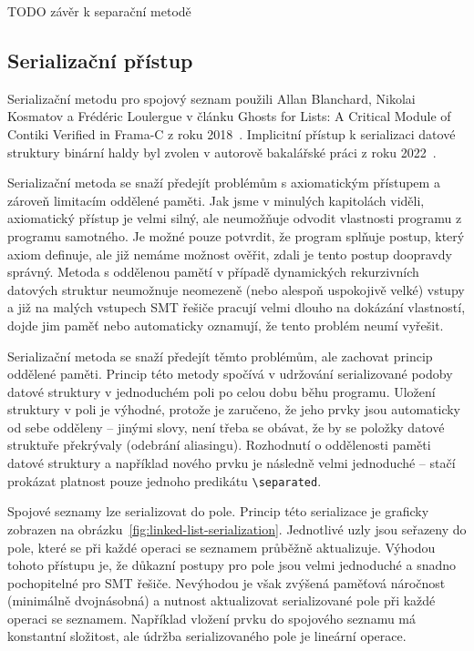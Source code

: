 TODO závěr k separační metodě

\subsection{Serializační přístup}
\label{subsec:serializacni-pristup}

Serializační metodu pro spojový seznam použili
Allan Blanchard, Nikolai Kosmatov a Frédéric Loulergue
v článku Ghosts for Lists: A Critical Module of Contiki Verified in Frama-C
z roku 2018~\cite{FCGhostsForLists}.
Implicitní přístup k serializaci datové struktury binární haldy
byl zvolen v autorově bakalářské práci z roku 2022~\cite{ZapotocnyBinarniHalda}.

Serializační metoda se snaží předejít problémům s axiomatickým přístupem
a zároveň limitacím oddělené paměti.
Jak jsme v minulých kapitolách viděli,
axiomatický přístup je velmi silný, ale neumožňuje odvodit vlastnosti programu z programu samotného.
Je možné pouze potvrdit, že program splňuje postup, který axiom definuje,
ale již nemáme možnost ověřit, zdali je tento postup doopravdy správný.
Metoda s oddělenou pamětí v případě dynamických rekurzivních datových struktur neumožnuje
neomezeně (nebo alespoň uspokojivě velké) vstupy a již na malých vstupech SMT řešiče pracují velmi dlouho na dokázání vlastností,
dojde jim paměť nebo automaticky oznamují, že tento problém neumí vyřešit.

Serializační metoda se snaží předejít těmto problémům, ale zachovat princip oddělené paměti.
Princip této metody spočívá v udržování serializované podoby datové struktury
v jednoduchém poli po celou dobu běhu programu.
Uložení struktury v poli je výhodné, protože je zaručeno,
že jeho prvky jsou automaticky od sebe odděleny – jinými slovy,
není třeba se obávat, že by se položky datové struktuře překrývaly (odebrání aliasingu).
Rozhodnutí o oddělenosti paměti datové struktury a například nového prvku
je následně velmi jednoduché – stačí prokázat platnost pouze jednoho predikátu \texttt{\textbackslash separated}.

Spojové seznamy lze serializovat do pole.
Princip této serializace je graficky zobrazen na obrázku~\ref{fig:linked-list-serialization}.
Jednotlivé uzly jsou seřazeny do pole, které se při každé operaci se seznamem průběžně aktualizuje.
Výhodou tohoto přístupu je, že důkazní postupy pro pole jsou velmi jednoduché a snadno pochopitelné pro SMT řešiče.
Nevýhodou je však zvýšená paměťová náročnost (minimálně dvojnásobná)
a nutnost aktualizovat serializované pole při každé operaci se seznamem.
Například vložení prvku do spojového seznamu má konstantní složitost,
ale údržba serializovaného pole je lineární operace.

